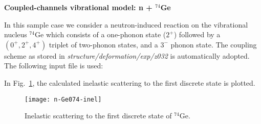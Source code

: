 \begin{samplecase}
{\bf Coupled-channels vibrational model: n + ${}^{74}$Ge}\newline

In this sample case we consider a neutron-induced reaction on
the vibrational nucleus $^{74}$Ge which consists of a 
one-phonon state ($2^{+}$) followed by a $(0^{+}, 2^{+}, 4^{+})$ triplet of 
two-phonon states, and a $3^{-}$ phonon state. The coupling scheme as stored in 
{\em structure/deformation/exp/z032} is automatically adopted. The following 
input file is used:


In Fig.~\ref{geinel}, the calculated inelastic scattering to the first 
discrete state is plotted.
\end{samplecase}
\begin{figure}
\centering\texttt{[image: n-Ge074-inel]}
\caption{Inelastic scattering to the first discrete state of ${}^{74}$Ge.}
\label{geinel}
\end{figure}
